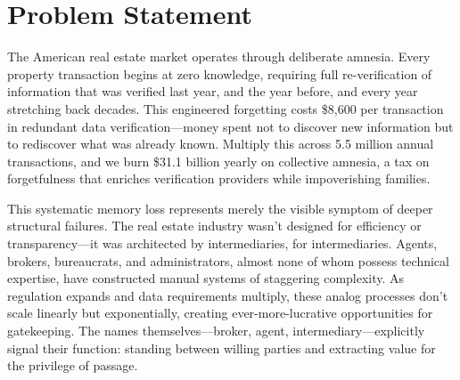 \chapter{Problem Statement}

The American real estate market operates through deliberate amnesia. Every property transaction begins at zero knowledge, requiring full re-verification of information that was verified last year, and the year before, and every year stretching back decades. This engineered forgetting costs \$8,600 per transaction in redundant data verification—money spent not to discover new information but to rediscover what was already known. Multiply this across 5.5 million annual transactions, and we burn \$31.1 billion yearly on collective amnesia, a tax on forgetfulness that enriches verification providers while impoverishing families.

This systematic memory loss represents merely the visible symptom of deeper structural failures. The real estate industry wasn't designed for efficiency or transparency—it was architected by intermediaries, for intermediaries. Agents, brokers, bureaucrats, and administrators, almost none of whom possess technical expertise, have constructed manual systems of staggering complexity. As regulation expands and data requirements multiply, these analog processes don't scale linearly but exponentially, creating ever-more-lucrative opportunities for gatekeeping. The names themselves—broker, agent, intermediary—explicitly signal their function: standing between willing parties and extracting value for the privilege of passage.

